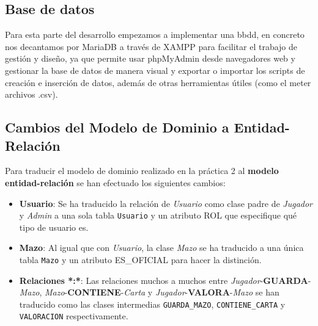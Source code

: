 \documentclass[10pt]{article}
\begin{document}
	
	
	
	
	\subsection{Base de datos}
	Para esta parte del desarrollo empezamos a implementar una bbdd, en concreto nos decantamos por  MariaDB a través de XAMPP para facilitar el trabajo de gestión y diseño, ya que permite usar phpMyAdmin desde navegadores web y gestionar la base de datos de manera visual y exportar o importar los scripts de creación e inserción de datos,  además de otras herramientas útiles (como el meter archivos .csv).
	
	\subsection{Cambios del Modelo de Dominio a Entidad-Relación}
	Para traducir el modelo de dominio realizado en la práctica 2 al \textbf{modelo entidad-relación} se han efectuado los siguientes cambios:
	\begin{itemize}
		\item \textbf{Usuario}: Se ha traducido la relación de \textit{Usuario} como clase padre de \textit{Jugador} y \textit{Admin} a una sola tabla \texttt{Usuario} y un atributo ROL que especifique qué tipo de usuario es.
		\item \textbf{Mazo}: Al igual que con \textit{Usuario}, la clase \textit{Mazo} se ha traducido a una única tabla \texttt{Mazo} y un atributo ES\_OFICIAL para hacer la distinción.
		\item \textbf{Relaciones *:*}: Las relaciones muchos a muchos entre \textit{Jugador}-\textbf{GUARDA}-\textit{Mazo}, \textit{Mazo}-\textbf{CONTIENE}-\textit{Carta} y \textit{Jugador}-\textbf{VALORA}-\textit{Mazo} se han traducido como las clases intermedias \texttt{GUARDA\_MAZO}, \texttt{CONTIENE\_CARTA} y \texttt{VALORACION} respectivamente.
		
	\end{itemize}
	
\end{document}
